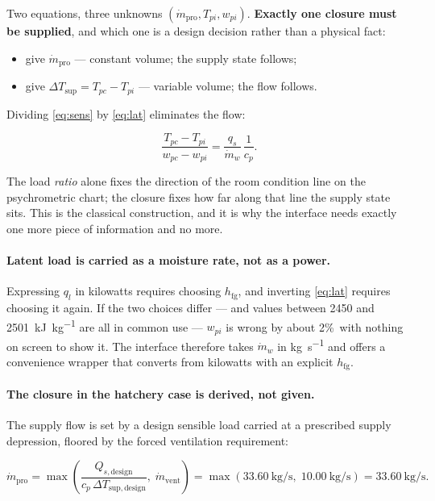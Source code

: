 \documentclass[11pt]{article}
\newcommand{\mdp}{\ensuremath{\dot m_{\mathrm{pro}}}}
\newcommand{\mdv}{\ensuremath{\dot m_{\mathrm{vent}}}}
\newcommand{\mdw}{\ensuremath{\dot m_{w}}}
\newcommand{\hfg}{\ensuremath{h_{\mathrm{fg}}}}
\newcommand{\qs}{\ensuremath{q_{s}}}
\newcommand{\ql}{\ensuremath{q_{l}}}
\begin{document}
Two equations, three unknowns $(\mdp, T_{pi}, w_{pi})$. \textbf{Exactly one
closure must be supplied}, and which one is a design decision rather than a
physical fact:

\begin{itemize}[nosep]
  \item give $\mdp$ --- constant volume; the supply state follows;
  \item give $\Delta T_{\mathrm{sup}} = T_{pc}-T_{pi}$ --- variable volume;
        the flow follows.
\end{itemize}

Dividing \eqref{eq:sens} by \eqref{eq:lat} eliminates the flow:

\begin{equation}
\frac{T_{pc}-T_{pi}}{w_{pc}-w_{pi}} = \frac{\qs}{\mdw}\,\frac{1}{c_p}.
\end{equation}

The load \emph{ratio} alone fixes the direction of the room condition line on
the psychrometric chart; the closure fixes how far along that line the supply
state sits. This is the classical construction, and it is why the interface
needs exactly one more piece of information and no more.

\paragraph{Latent load is carried as a moisture rate, not as a power.}
Expressing $\ql$ in kilowatts requires choosing $\hfg$, and inverting
\eqref{eq:lat} requires choosing it again. If the two choices differ --- and
values between 2450 and \SI{2501}{\kilo\joule\per\kilogram} are all in common
use --- $w_{pi}$ is wrong by about 2\%\ with nothing on screen to show it. The
interface therefore takes $\mdw$ in \si{\kilogram\per\second} and offers a
convenience wrapper that converts from kilowatts with an explicit $\hfg$.

\paragraph{The closure in the hatchery case is derived, not given.}
The supply flow is set by a design sensible load carried at a prescribed
supply depression, floored by the forced ventilation requirement:

\begin{equation}
\mdp = \max\!\left(\frac{Q_{s,\mathrm{design}}}{c_p\,\Delta T_{\mathrm{sup,design}}},\;
\mdv\right)
= \max\!\left(\SI{33.60}{\kilogram\per\second},\;
\SI{10.00}{\kilogram\per\second}\right)
= \SI{33.60}{\kilogram\per\second}.
\end{equation}
\end{document}
